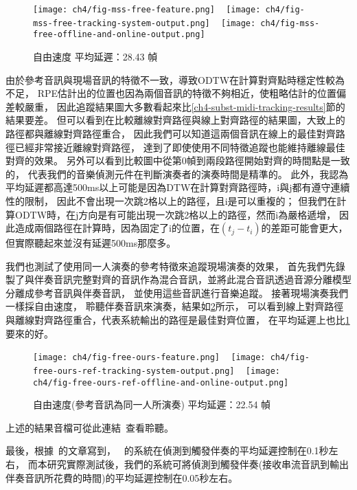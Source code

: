 \documentclass[class=NCU_thesis, crop=false]{standalone}
\begin{document}
\begin{figure}[H]
    \centering
    \subcaptionbox
    {
    \label{fig:mss-free-feature}}
    {\texttt{[image: ch4/fig-mss-free-feature.png]}}
    ~
    \subcaptionbox
    {
    \label{fig:mss-free-tracking-output}}
    {\texttt{[image: ch4/fig-mss-free-tracking-system-output.png]}}
    ~
    \subcaptionbox
    {
    \label{fig:mss-free-comparision-output}}
    {\texttt{[image: ch4/fig-mss-free-offline-and-online-output.png]}}
    \caption{自由速度 平均延遲：28.43 幀}
    \label{fig:fig-ch4-mss-free-tracking-results}
\end{figure}

由於參考音訊與現場音訊的特徵不一致，導致ODTW在計算對齊點時穩定性較為不足，
RPE估計出的位置也因為兩個音訊的特徵不夠相近，使粗略估計的位置偏差較嚴重，
因此追蹤結果圖大多數看起來比\ref{ch4-subst-midi-tracking-results}節的結果要差。
但可以看到在比較離線對齊路徑與線上對齊路徑的結果圖，大致上的路徑都與離線對齊路徑重合，
因此我們可以知道這兩個音訊在線上的最佳對齊路徑已經非常接近離線對齊路徑，
達到了即使使用不同特徵追蹤也能維持離線最佳對齊的效果。
另外可以看到比較圖中從第0幀到兩段路徑開始對齊的時間點是一致的，
代表我們的音樂偵測元件在判斷演奏者的演奏時間是精準的。
此外，我認為平均延遲都高達500ms以上可能是因為DTW在計算對齊路徑時，i與j都有遵守連續性的限制，
因此不會出現一次跳2格以上的路徑，且i是可以重複的；
但我們在計算ODTW時，在j方向是有可能出現一次跳2格以上的路徑，然而i為嚴格遞增，
因此造成兩個路徑在計算時，因為固定了i的位置，在$(t_j-t_i)$的差距可能會更大，
但實際聽起來並沒有延遲500ms那麼多。

我們也測試了使用同一人演奏的參考特徵來追蹤現場演奏的效果，
首先我們先錄製了與伴奏音訊完整對齊的音訊作為混合音訊，並將此混合音訊透過音源分離模型分離成參考音訊與伴奏音訊，
並使用這些音訊進行音樂追蹤。
接著現場演奏我們一樣採自由速度，
聆聽伴奏音訊來演奏，結果如\cref{fig:fig-ch4-free-ours-ref-tracking-results}所示，
可以看到線上對齊路徑與離線對齊路徑重合，代表系統輸出的路徑是最佳對齊位置，
在平均延遲上也比\cref{fig:fig-ch4-mss-free-tracking-results}要來的好。

\begin{figure}[H]
    \centering
    \subcaptionbox
    {
    \label{fig:free-ours-feature}}
    {\texttt{[image: ch4/fig-free-ours-feature.png]}}
    ~
    \subcaptionbox
    {
    \label{fig:free-ours-ref-tracking-output}}
    {\texttt{[image: ch4/fig-free-ours-ref-tracking-system-output.png]}}
    ~
    \subcaptionbox
    {
    \label{fig:free-ours-ref-comparision-output}}
    {\texttt{[image: ch4/fig-free-ours-ref-offline-and-online-output.png]}}
    \caption{自由速度(參考音訊為同一人所演奏) 平均延遲：22.54 幀}
    \label{fig:fig-ch4-free-ours-ref-tracking-results}
\end{figure}
上述的結果音檔可從此連結~\cite{YuJieLin2024DiffFeatureTrackingResults}查看聆聽。

最後，根據~\cite{lin2021AIMusician}的文章寫到，
~\cite{Lin2020AHumanComputerDuetSystem}的系統在偵測到觸發伴奏的平均延遲控制在0.1秒左右，
而本研究實際測試後，我們的系統可將偵測到觸發伴奏(接收串流音訊到輸出伴奏音訊所花費的時間)的平均延遲控制在0.05秒左右。



\pagebreak
\end{document}
